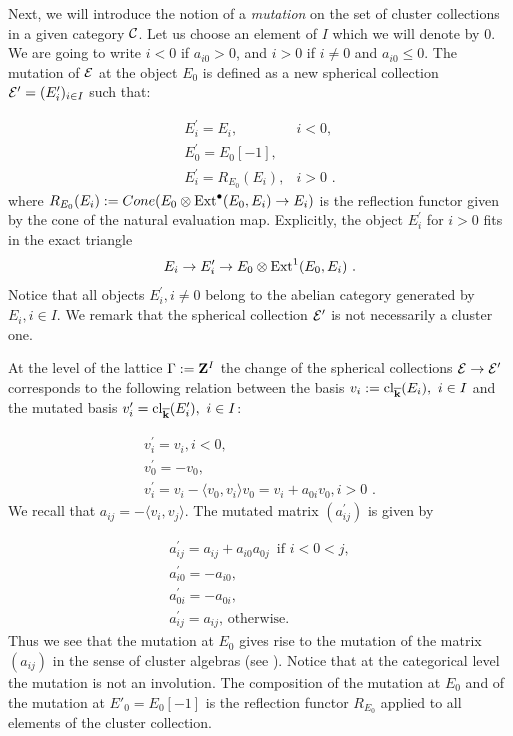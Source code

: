 \documentclass[12pt]{article}
\begin{document}
Next, we will introduce the notion of a {\it mutation} on the set of cluster collections in a given category ${\mathcal C}$. Let us choose an element of $I$ which we will denote by $0$. We are going to write $i<0$ if $a_{i0}>0$, and $i>0$ if $i\ne 0$ and $a_{i0}\leqslant 0$. The mutation of ${\cal E}$ at the object $E_0$ is defined as a new spherical collection ${\cal E}^{\prime}=(E_i^{\prime})_{i\in I}$ such that:


$$\begin{array}{ll}
E_i^{\prime}=E_i, & i<0,\\
 E_0^{\prime}=E_0[-1], &\\
  E_i^{\prime}=R_{E_0}(E_i), &i>0\,\,.
  \end{array}$$
where $R_{E_0}(E_i):=
Cone(E_0\otimes \operatorname{Ext}^{\bullet}(E_0,E_i)\to E_i)$ is the reflection functor given by 
 the cone of the natural evaluation map. Explicitly, 
the object $E_i^{\prime}$ for  $i>0$ fits in the exact triangle $$E_i\to E_i^{\prime}\to E_0\otimes \operatorname{Ext}^1(E_0,E_i)\,\,.$$
 Notice that all objects $E_i^{\prime},i\ne 0$ belong to the abelian category generated by $E_i,i\in I$.
We remark that the spherical collection  ${\cal E}^{\prime}$ is not necessarily a cluster one.

At the level of the lattice $\Gamma:={\bf Z}^I$ the change of the spherical collections
${\cal E}\to {\cal E}^{\prime}$ corresponds to the following
relation between the  basis $v_i:= \operatorname{cl}_{{\overline{\bf k}}}(E_i),\,\,i\in I$ and the mutated basis $ v_i^{\prime}=\operatorname{cl}_{{\overline{\bf k}}}(E_i^{\prime}),\,\,i\in I$:

$$ \begin{array}{l}v_i^{\prime}=v_i, i< 0, \\
v_0^{\prime}=-v_0,\\
v_i^{\prime}=v_i-\langle v_0,v_i \rangle v_0=v_i+a_{0i}v_0, i>0\,\,.
\end{array}$$
We recall that $a_{ij}=-\langle v_i,v_j\rangle$.
The mutated matrix $(a_{ij}^{\prime})$ is given by

$$\begin{array}{l}a_{ij}^{\prime}=a_{ij}+a_{i0}a_{0j}\,\mbox{ if } i<0<j,\\
a_{i0}^{\prime}=-a_{i0},\\
a_{0i}^{\prime}=-a_{0i},\\
a_{ij}^{\prime}=a_{ij},\, \mbox{otherwise}.\end{array}$$
Thus we see that the mutation at $E_0$ gives rise to the mutation
of the matrix $(a_{ij})$ in the sense of cluster algebras (see \cite{Ze}).
Notice that at the categorical level the mutation is not an involution. The composition of the mutation at $E_0$ and of the mutation at
 $E'_0=E_0[-1]$ is the reflection functor  $R_{E_0}$ 
applied to all elements of the cluster collection.
\end{document}
